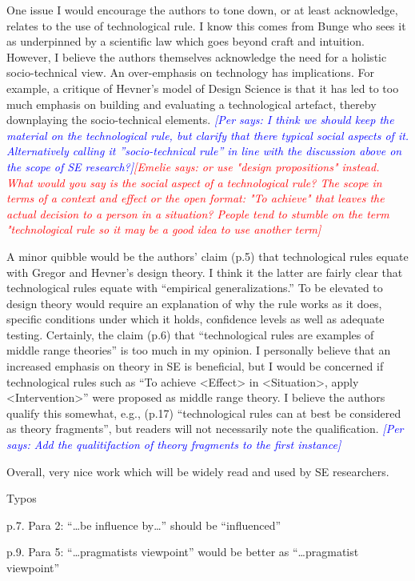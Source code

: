 \documentclass{article}
\newcommand{\emelie}[1]{\textcolor{red}{{\it [Emelie says: #1]}}}
\newcommand{\per}[1]{\textcolor{blue}
        	{{\it [Per says: #1]}}}
\newcommand{\emelie}[1]{}
\newcommand{\per}[1]{}
\begin{document}
One issue I would encourage the authors to tone down, or at least acknowledge, relates to the use of technological rule. I know this comes from Bunge who sees it as underpinned by a scientific law which goes beyond craft and intuition. However, I believe the authors themselves acknowledge the need for a holistic socio-technical view. An over-emphasis on technology has implications. For example, a critique of Hevner’s model of Design Science is that it has led to too much emphasis on building and evaluating a technological artefact, thereby downplaying the socio-technical elements. \per{I think we should keep the material on the technological rule, but clarify that there typical social aspects of it. Alternatively calling it ''socio-technical rule'' in line with the discussion above on the scope of SE research?}\emelie{or use "design propositions" instead. What would you say is the social aspect of a technological rule? The scope in terms of a context and effect or the open format: "To achieve" that leaves the actual decision to a person in a situation? People tend to stumble on the term "technological rule so it may be a good idea to use another term}

A minor quibble would be the authors’ claim (p.5) that technological rules equate with Gregor and Hevner’s design theory.  I think it the latter are fairly clear that technological rules equate with “empirical generalizations.”  To be elevated to design theory would require an explanation of why the rule works as it does, specific conditions under which it holds, confidence levels as well as adequate testing. Certainly, the claim (p.6) that “technological rules are examples of middle range theories” is too much in my opinion. I personally believe that an increased emphasis on theory in SE is beneficial, but I would be concerned if technological rules such as “To achieve <Effect> in <Situation>, apply <Intervention>” were proposed as middle range theory. I believe the authors qualify this somewhat, e.g., (p.17) “technological rules can at best be considered as theory fragments”, but readers will not necessarily note the qualification. \per{Add the qualitifaction of theory \emph{fragments} to the first instance}
 
Overall, very nice work which will be widely read and used by SE researchers.
 

Typos
 
p.7. Para 2: “…be influence by…” should be “influenced”
 
p.9. Para 5: “…pragmatists viewpoint” would be better as “…pragmatist viewpoint”
 
\end{document}
